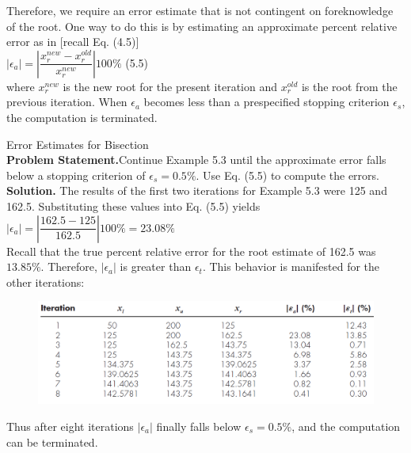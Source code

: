 \documentclass[../main.tex]{subfiles}
\begin{document}
Therefore, we require an error estimate that is not contingent on foreknowledge of the
root. One way to do this is by estimating an approximate percent relative error as in [recall
Eq. (4.5)]\\

$\left\lvert \epsilon_a \right\rvert = \left\lvert \dfrac{x^{new}_r - x^{old}_r}{x^{new}_r} \right\rvert 100\%$
\hfill (5.5)\\

\noindent where $x^{new}_r$ is the new root for the present iteration and $x^{old}_r$ is the root 
from the previous iteration. When $\epsilon_a$ becomes less than a prespecified stopping criterion 
$\epsilon_s$, the computation is terminated.\\

\begin{example} Error Estimates for Bisection\\
    
    \noindent\textbf{Problem Statement.}\quad Continue Example 5.3 until the approximate error falls below a
    stopping criterion of $\epsilon_s = 0.5\%$. Use Eq. (5.5) to compute the errors.\\

    \noindent\textbf{Solution.} The results of the first two iterations for Example 5.3 were 125 and 162.5. Substituting
    these values into Eq. (5.5) yields\\

    $\left\lvert \epsilon_a \right\rvert = \left\lvert \dfrac{162.5-125}{162.5} \right\rvert 100\% = 23.08\%$\\

    \noindent Recall that the true percent relative error for the root estimate of 162.5 was $13.85\%$. Therefore,
    $\left\lvert \epsilon_a \right\rvert$ is greater than $\epsilon_t$. This behavior is manifested for the other iterations:\\

    \begin{figure}[h]
        \includegraphics[width=0.75\linewidth]{./images/example_5_4_1}
    \end{figure}
    \newpage
    \noindent Thus after eight iterations $\left\lvert \epsilon_a \right\rvert $ finally falls below $\epsilon_s = 0.5\%$, and the computation can be
    terminated.


\end{example}
\end{document}
